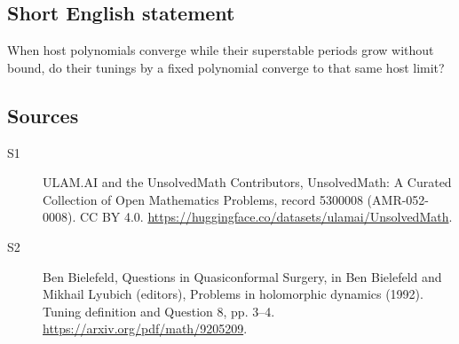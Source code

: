 \documentclass[11pt]{article}
\begin{document}
\subsection{Short English statement}
When host polynomials converge while their superstable periods grow without bound, do their tunings by a fixed polynomial converge to that same host limit?
\subsection{Sources}
\begin{description}
\item[\hypertarget{source:5300008:1}{S1}] ULAM.AI and the UnsolvedMath Contributors, UnsolvedMath: A Curated Collection of Open Mathematics Problems, record 5300008 (AMR-052-0008). CC BY 4.0. \url{https://huggingface.co/datasets/ulamai/UnsolvedMath}.
\item[\hypertarget{source:5300008:2}{S2}] Ben Bielefeld, Questions in Quasiconformal Surgery, in Ben Bielefeld and Mikhail Lyubich (editors), Problems in holomorphic dynamics (1992). Tuning definition and Question 8, pp. 3–4. \url{https://arxiv.org/pdf/math/9205209}.
\end{description}
\label{end:5300008}
\end{document}
